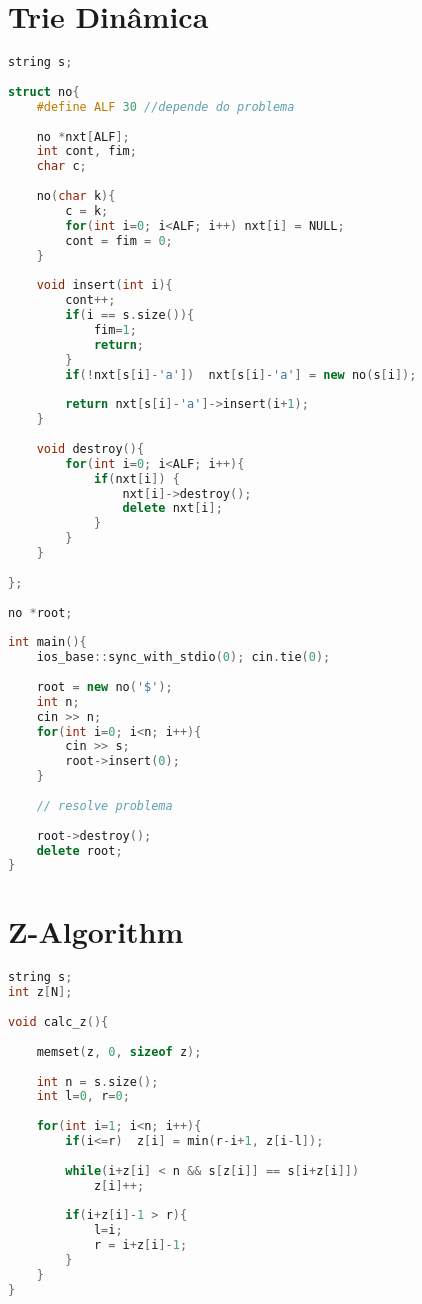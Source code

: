 \documentclass[12pt,a4paper,twoside]{report}
\begin{document}
\section{Trie Dinâmica}
\noindent\begin{lstlisting}[caption=Trie Dinâmica,language=C++]
string s;
 
struct no{
    #define ALF 30 //depende do problema
 
    no *nxt[ALF];
    int cont, fim;
    char c;
     
    no(char k){
        c = k;
        for(int i=0; i<ALF; i++) nxt[i] = NULL;
        cont = fim = 0;
    }
     
    void insert(int i){
        cont++;
        if(i == s.size()){
            fim=1;
            return;
        }
        if(!nxt[s[i]-'a'])  nxt[s[i]-'a'] = new no(s[i]);
         
        return nxt[s[i]-'a']->insert(i+1);
    }
     
    void destroy(){
        for(int i=0; i<ALF; i++){
            if(nxt[i]) {
                nxt[i]->destroy();
                delete nxt[i];
            }
        }
    }
     
};
 
no *root;
 
int main(){
    ios_base::sync_with_stdio(0); cin.tie(0);
     
    root = new no('$');
    int n;
    cin >> n;
    for(int i=0; i<n; i++){
        cin >> s;
        root->insert(0);
    }
     
    // resolve problema
     
    root->destroy();
    delete root;
}
\end{lstlisting}

\section{Z-Algorithm}
\noindent\begin{lstlisting}[caption=Z-Algorithm,language=C++]
string s;
int z[N];
 
void calc_z(){
     
    memset(z, 0, sizeof z);
     
    int n = s.size();
    int l=0, r=0;
     
    for(int i=1; i<n; i++){
        if(i<=r)  z[i] = min(r-i+1, z[i-l]);
         
        while(i+z[i] < n && s[z[i]] == s[i+z[i]])
            z[i]++;
         
        if(i+z[i]-1 > r){
            l=i;
            r = i+z[i]-1;
        }
    }
}
\end{lstlisting}
\end{document}
